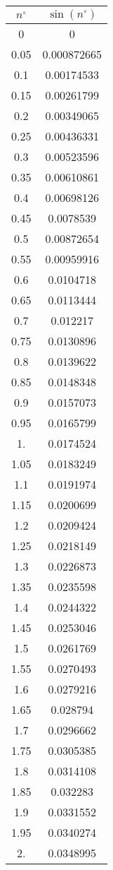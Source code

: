 \documentclass[12pt]{article}
\begin{document}
\begin{tabular}{||c|c||}
\hline\hline
$n^\circ$ & $\sin(n^\circ)$\\
\hline\hline
0 & 0 \\\hline
 0.05 & 0.000872665 \\\hline
 0.1 & 0.00174533 \\\hline
 0.15 & 0.00261799 \\\hline

0.2 & 0.00349065 \\\hline
 0.25 & 0.00436331 \\\hline
 0.3 & 0.00523596 \\\hline
 0.35 &
   0.00610861 \\\hline
 0.4 & 0.00698126 \\\hline
 0.45 & 0.0078539 \\\hline
 0.5 & 0.00872654
\\\hline
 0.55 & 0.00959916 \\\hline
 0.6 & 0.0104718 \\\hline
 0.65 & 0.0113444 \\\hline
 0.7 &
   0.012217 \\\hline
 0.75 & 0.0130896 \\\hline
 0.8 & 0.0139622 \\\hline
 0.85 & 0.0148348 \\\hline

0.9 & 0.0157073 \\\hline
 0.95 & 0.0165799 \\\hline
 1. & 0.0174524 \\\hline
 1.05 &
   0.0183249 \\\hline
 1.1 & 0.0191974 \\\hline
 1.15 & 0.0200699 \\\hline
 1.2 & 0.0209424 \\\hline

1.25 & 0.0218149 \\\hline
 1.3 & 0.0226873 \\\hline
 1.35 & 0.0235598 \\\hline
 1.4 &
   0.0244322 \\\hline
 1.45 & 0.0253046 \\\hline
 1.5 & 0.0261769 \\\hline
 1.55 & 0.0270493 \\\hline

1.6 & 0.0279216 \\\hline
 1.65 & 0.028794 \\\hline
 1.7 & 0.0296662 \\\hline
 1.75 &
   0.0305385 \\\hline
 1.8 & 0.0314108 \\\hline
 1.85 & 0.032283 \\\hline
 1.9 & 0.0331552 \\\hline

1.95 & 0.0340274 \\\hline
 2. & 0.0348995 \\\hline
\end{tabular}
\end{document}
